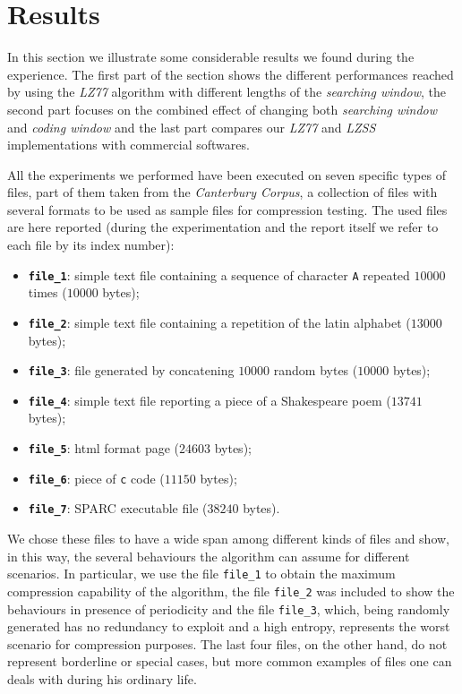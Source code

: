 \section{Results}
In this section we illustrate some considerable results we found during the experience. The first part of the section shows the different performances reached by using the \textit{LZ77} algorithm with different lengths of the \textit{searching window}, the second part focuses on the combined effect of changing both \textit{searching window} and \textit{coding window} and the last part compares our \textit{LZ77} and \textit{LZSS} implementations with commercial softwares.

All the experiments we performed have been executed on seven specific types of files, part of them taken from the \textit{Canterbury Corpus}, a collection of files with several formats to be used as sample files for compression testing. The used files are here reported (during the experimentation and the report itself we refer to each file by its index number):

\begin{itemize}
\item
\textbf{\texttt{file\_1}}: simple text file containing a sequence of character \texttt{A} repeated $10000$ times ($10000$ bytes);

\item
\textbf{\texttt{file\_2}}: simple text file containing a repetition of the latin alphabet ($13000$ bytes);

\item
\textbf{\texttt{file\_3}}: file generated by concatening $10000$ random bytes ($10000$ bytes);

\item
\textbf{\texttt{file\_4}}: simple text file reporting a piece of a Shakespeare poem ($13741$ bytes);

\item
\textbf{\texttt{file\_5}}: html format page ($24603$ bytes);

\item
\textbf{\texttt{file\_6}}: piece of \texttt{c} code ($11150$ bytes);

\item
\textbf{\texttt{file\_7}}: SPARC executable file ($38240$ bytes).
\end{itemize}

We chose these files to have a wide span among different kinds of files and show, in this way, the several behaviours the algorithm can assume for different scenarios. In particular, we use the file \texttt{file\_1} to obtain the maximum compression capability of the algorithm, the file \texttt{file\_2} was included to show the behaviours in presence of periodicity and the file \texttt{file\_3}, which, being randomly generated has no redundancy to exploit and a high entropy, represents the worst scenario for compression purposes. The last four files, on the other hand, do  not represent borderline or special cases, but more common examples of files one can deals with during his ordinary life.

